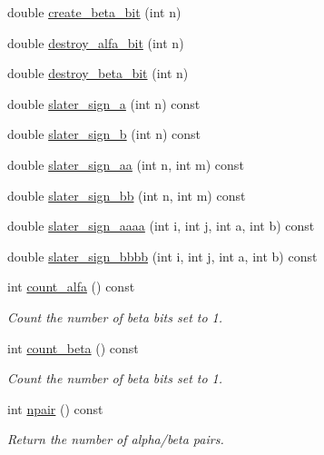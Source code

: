 \begin{DoxyCompactItemize}
double \mbox{\hyperlink{classforte_1_1_determinant_impl_a029be4ce6d50df77300096e58a83a42f}{create\+\_\+beta\+\_\+bit}} (int n)
\item 
double \mbox{\hyperlink{classforte_1_1_determinant_impl_a01c1ef1e7f640bc18a3e6fa18116d848}{destroy\+\_\+alfa\+\_\+bit}} (int n)
\item 
double \mbox{\hyperlink{classforte_1_1_determinant_impl_ad19fd82d5428c19620d44868984fbd32}{destroy\+\_\+beta\+\_\+bit}} (int n)
\item 
double \mbox{\hyperlink{classforte_1_1_determinant_impl_ae654b55997ceb9a745edbd60a4d6978d}{slater\+\_\+sign\+\_\+a}} (int n) const
\item 
double \mbox{\hyperlink{classforte_1_1_determinant_impl_ad6b9f063782fe2abb85a742f0a223ec1}{slater\+\_\+sign\+\_\+b}} (int n) const
\item 
double \mbox{\hyperlink{classforte_1_1_determinant_impl_abb5dee18e8891364cc6f60f282e5a7f8}{slater\+\_\+sign\+\_\+aa}} (int n, int m) const
\item 
double \mbox{\hyperlink{classforte_1_1_determinant_impl_afa8fce46c2de5e0d65878f49315aeb9f}{slater\+\_\+sign\+\_\+bb}} (int n, int m) const
\item 
double \mbox{\hyperlink{classforte_1_1_determinant_impl_ab1855ca2b1feed1b3733a36c7be64429}{slater\+\_\+sign\+\_\+aaaa}} (int i, int j, int a, int b) const
\item 
double \mbox{\hyperlink{classforte_1_1_determinant_impl_ac169e8423398ef5011450811c61a363b}{slater\+\_\+sign\+\_\+bbbb}} (int i, int j, int a, int b) const
\item 
int \mbox{\hyperlink{classforte_1_1_determinant_impl_abfc420df71d4fa00dcbf239a3b425f62}{count\+\_\+alfa}} () const
\begin{DoxyCompactList}\small\item\em Count the number of beta bits set to 1. \end{DoxyCompactList}\item 
int \mbox{\hyperlink{classforte_1_1_determinant_impl_acd8866f4054bf89589213992668eb3d2}{count\+\_\+beta}} () const
\begin{DoxyCompactList}\small\item\em Count the number of beta bits set to 1. \end{DoxyCompactList}\item 
int \mbox{\hyperlink{classforte_1_1_determinant_impl_ae08fd0456249dc605ba10b095afc2549}{npair}} () const
\begin{DoxyCompactList}\small\item\em Return the number of alpha/beta pairs. \end{DoxyCompactList}\item 

\end{DoxyCompactItemize}
